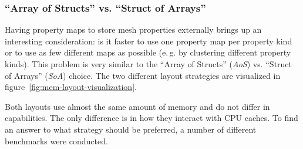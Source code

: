 \newpage
\subsubsection*{\enquote{Array of Structs} vs. \enquote{Struct of Arrays}}

Having property maps to store mesh properties externally brings up an interesting consideration: is it faster to use one property map per property kind or to use as few different maps as possible (e.\,g. by clustering different property kinds).
This problem is very similar to the \enquote{Array of Structs} (\emph{AoS}) vs. \enquote{Struct of Arrays} (\emph{SoA}) choice.
The two different layout strategies are visualized in figure~\ref{fig:mem-layout-visualization}.

Both layouts use almost the same amount of memory and do not differ in capabilities.
The only difference is in how they interact with CPU caches.
To find an answer to what strategy should be preferred, a number of different benchmarks were conducted.

